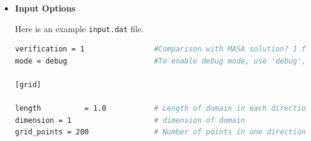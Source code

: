 \documentclass[12 pt, final]{article}
\begin{document}
\begin{itemize}
\begin{itemize}
        \texttt{curve\_1D\_plotter.script} and \texttt{surface\_2D\_plotter.script} create 1D curves (\texttt{plot.png}) and 2D surfaces (\texttt{surface.png}) for the temperature fields that get stored in \texttt{output.log} or \texttt{output\_100x100.log}.
        
        \item \underline{Tex files and report}
        The tex files and figures can be found in the \texttt{tex\_report} subdir. One can use \texttt{pdflatex proj01.tex} to build the report \texttt{proj01.pdf}.
        
    \item \underline{Various output files}
    
    \texttt{reference\_sol\_*.log} contain reference solutions created using \texttt{mesh\_size\_change.sh} for regression testing using \texttt{TOL = 1e-17} and \texttt{MAX\_ITERS= 1000000}.
    
    \texttt{convergence\_*.png} contains images of convergence analysis, created by \texttt{mesh\_size\_change.sh}
    
    \texttt{output.log} contains the position vs Temperature data, created by \texttt{main.cpp}. It gets updated every time the executable is run.
    
    \texttt{output\_100x100.log} is a snapshot solution of a 100x100 grid with gauss-seidel 4th order to plot surface plots.
    
    \texttt{output\_*.dat} is created by \texttt{mesh\_size\_change.sh} annd contains data on n, L2 error and time taken.
    
    \texttt{plot.png} has the 1D temperature vs x plot

    \texttt{surface.png} has the surface plot for temperature over a 2D domain.
    \end{itemize}
    \item \textbf{Input Options}
    
    Here is an example \texttt{input.dat} file.
    \begin{lstlisting}[language = bash, basicstyle=\tiny]
verification = 1                #Comparison with MASA solution? 1 for yes; no otherwise; Always keep as 1. Otherwise a couple of regression tests might fail.
mode = debug                    #To enable debug mode, use 'debug', anything else is normal mode.

[grid]

length          = 1.0           # Length of domain in each direction
dimension = 1                   # dimension of domain
grid_points = 200               # Number of points in one direction



\end{lstlisting}
\end{itemize}
\end{document}
